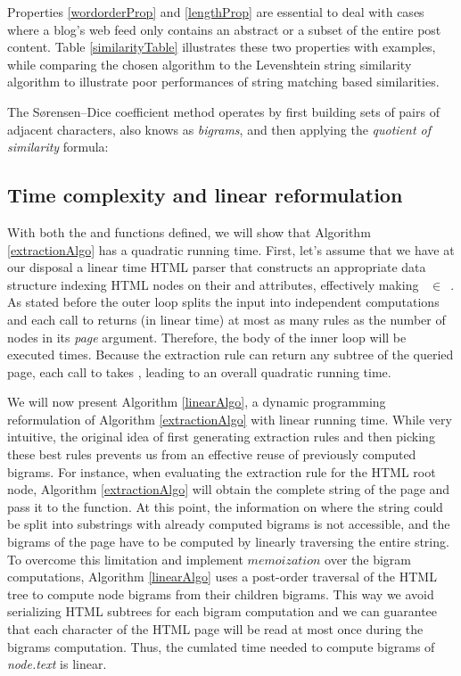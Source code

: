 Properties \ref{wordorderProp} and \ref{lengthProp} are essential to deal with cases where a blog's web feed only contains an abstract or a subset of the entire post content. Table \ref{similarityTable} illustrates these two properties with examples, while comparing the chosen algorithm to the Levenshtein string similarity algorithm\cite{levenshtein1966} to illustrate poor performances of string matching based similarities.

\similarityTable

The Sørensen–Dice coefficient method operates by first building sets of pairs of adjacent characters, also knows as \emph{bigrams}, and then applying the \emph{quotient of similarity} formula:

\similarityAlgo

\subsection{Time complexity and linear reformulation}
With both the  and  functions defined, we will show that Algorithm \ref{extractionAlgo} has a quadratic running time. First, let's assume that we have at our disposal a linear time HTML parser that constructs an appropriate data structure indexing HTML nodes on their  and  attributes, effectively making ~$\in$~. As stated before the outer loop splits the input into independent computations and each call to  returns (in linear time) at most as many rules as the number of nodes in its \emph{page} argument. Therefore, the body of the inner loop will be executed  times. Because the extraction rule can return any subtree of the queried page, each call to  takes , leading to an overall quadratic running time.

We will now present Algorithm \ref{linearAlgo}, a dynamic programming reformulation of Algorithm \ref{extractionAlgo} with linear running time. While very intuitive, the original idea of first generating extraction rules and then picking these best rules prevents us from an effective reuse of previously computed bigrams. For instance, when evaluating the extraction rule for the HTML root node, Algorithm \ref{extractionAlgo} will obtain the complete string of the page and pass it to the  function. At this point, the information on where the string could be split into substrings with already computed bigrams is not accessible, and the bigrams of the page have to be computed by linearly traversing the entire string. To overcome this limitation and implement $memoization$ over the bigram computations, Algorithm \ref{linearAlgo} uses a post-order traversal of the HTML tree to compute node bigrams from their children bigrams. This way we avoid serializing HTML subtrees for each bigram computation and we can guarantee that each character of the HTML page will be read at most once during the bigrams computation. Thus, the cumlated time needed to compute bigrams of \emph{node.text} is linear.

